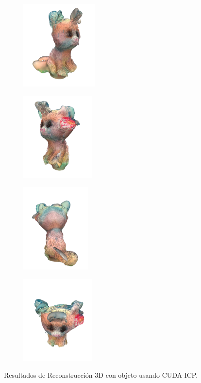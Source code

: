 \begin{figure}[h]
\begin{subfigure}[t]{0.2\textheight}
    \end{subfigure}
    \begin{subfigure}[t]{0.2\textheight}
    	\centering
        \includegraphics[height=4.5cm]{archivos/experimentacion-3-resultado-malla.png}
    \end{subfigure}
    \begin{subfigure}[t]{0.2\textheight}
    	\centering
        \includegraphics[height=4.5cm]{archivos/experimentacion-3-resultado-malla-2.png}
    \end{subfigure}
    \begin{subfigure}[t]{0.2\textheight}
    	\centering
        \includegraphics[height=4.5cm]{archivos/experimentacion-3-resultado-malla-3.png}
    \end{subfigure}
    \begin{subfigure}[t]{0.2\textheight}
    	\centering
        \includegraphics[height=4.5cm]{archivos/experimentacion-3-resultado-malla-4.png}
    \end{subfigure}
    \caption{Resultados de Reconstrucción 3D con objeto usando CUDA-ICP.}
    \label{fig:resultados-reconstruccion-objeto-cuda}
\end{figure}

